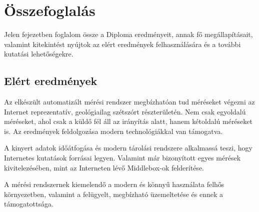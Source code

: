 \chapter{Összefoglalás}
Jelen fejezetben foglalom össze a Diploma eredményeit, annak fő megállapításait, valamint kitekintést nyújtok az elért eredmények felhasználására és a további kutatási lehetőségekre.

\section{Elért eredmények}

Az elkészült automatizált mérési rendszer megbízhatóan tud méréseket végezni az Internet reprezentatív, geológiailag szétszórt részterületén. Nem csak egyoldalú méréseket, ahol csak a küldő fél áll az irányítás alatt, hanem kétoldalú méréseket is. Az eredmények feldolgozása modern technológiákkal van támogatva. 

A kinyert adatok időátfogása és modern tárolási rendszere alkalmassá teszi, hogy Internetes kutatások forrásai legyen. Valamint már bizonyított egyes mérések kivitelezésében, mint az Interneten lévő Middlebox-ok felderítése. 

A mérési rendszernek kiemelendő a modern és könnyű használata felhős környezetben, valamint a felügyelt, megbízható üzemeltetése és ennek a támogatottsága.



%


